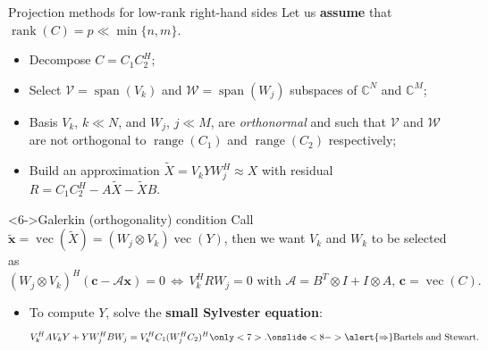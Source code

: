 \documentclass[aspectratio=169,xcolor=dvipsnames]{beamer}
\begin{document}
	\begin{frame}{Projection methods for low-rank right-hand sides}
	Let us \textbf{assume} that $\operatorname{rank}{(C)} = p \ll \min\{n,m\}$.
	\begin{itemize}
		\item[\faCog]<2-> Decompose $C = C_1 C_2^H$;
		\item[\faCog]<3-> Select $\mathcal{V} = \operatorname{span}(V_k)$ and $\mathcal{W} = \operatorname{span}(W_j)$ subspaces of $\mathbb{C}^{N}$ and $\mathbb{C}^M$;
		\item[\faCog]<4-> Basis $V_k$, $k \ll N$, and $W_j$, $j \ll M$,  are \emph{orthonormal} and such that $\mathcal{V}$ and $\mathcal{W}$ are not orthogonal to $\operatorname{range}(C_1)$ and $\operatorname{range}(C_2)$ respectively;
		\item[\faCog]<5-> Build an approximation $\tilde{X} = V_k Y W_j^H \approx X$ with residual $R = C_1C_2^H - A \tilde{X} - \tilde{X}B$.
	\end{itemize}
	\begin{exampleblock}<6->{Galerkin (orthogonality) condition}
	Call $\tilde{\mathbf{x}} = \operatorname{vec}(\tilde{X}) = (W_j \otimes V_k)\operatorname{vec}(Y)$, then we want $V_k$ and $W_k$ to be selected as
	\[
	(W_j \otimes V_k)^H (\mathbf{c} - \mathcal{A} \mathbf{x}) = 0 \,\Leftrightarrow \, V_k^H R W_j = 0 \text{ with } \mathcal{A} = B^T \otimes I + I \otimes A, \, \mathbf{c} = \operatorname{vec}(C).
	\]
	\end{exampleblock}
	\begin{itemize}
		\item[\faWrench]<7-> To compute $Y$, solve the \textbf{small Sylvester equation}:
		\[
		V_k^H A V_k Y + Y W_j^H B W_j = V_k^H C_1 (W_j^H C_2)^H\only<7>{.}\onslide<8->{ \alert{\Rightarrow} \text{Bartels and Stewart}.}
		\]
	\end{itemize}
	\end{frame}
\end{document}
